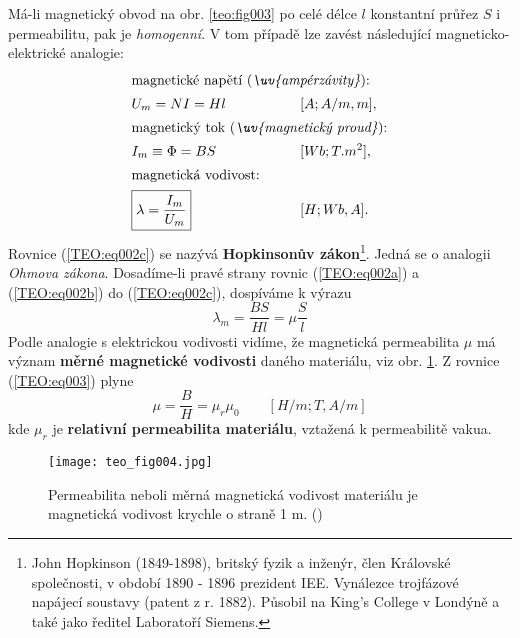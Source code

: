       Má-li magnetický obvod na obr. \ref{teo:fig003} po celé délce \(l\) konstantní průřez \(S\) i 
      permeabilitu, pak je \emph{homogenní}. V tom případě lze zavést následující 
      magneticko-elektrické analogie:
      \begin{alignat}{3}
       \shortintertext{magnetické napětí (\emph{\uv{ampérzávity}}):}
        & U_m = NI = Hl        \quad && \text{ } \qquad
           && [A; A/m, m],  \label{TEO:eq002a}  \\
        \shortintertext{magnetický tok (\emph{\uv{magnetický proud}}):} 
        & I_m\equiv\Phi = BS \quad && \text{ } \qquad 
           && [Wb; T. m^2], \label{TEO:eq002b}  \\
        \shortintertext{magnetická vodivost:}
        & \boxed{\lambda = \frac{I_m}{U_m}} \quad && \text{ } \qquad 
           && [H; Wb, A].   \label{TEO:eq002c} 
      \end{alignat}
      Rovnice (\ref{TEO:eq002c}) se nazývá \textbf{Hopkinsonův  zákon}\footnote{John Hopkinson 
      (\num{1849}-\num{1898}), britský fyzik a inženýr, člen Královské společnosti, v období 1890 - 
      1896 prezident IEE. Vynálezce trojfázové napájecí soustavy (patent z r. 1882). Působil na 
      King's College v Londýně a také jako ředitel Laboratoří Siemens.}. Jedná se o analogii 
      \emph{Ohmova zákona}. Dosadíme-li pravé strany rovnic (\ref{TEO:eq002a}) a (\ref{TEO:eq002b}) 
      do (\ref{TEO:eq002c}), dospíváme k výrazu
      \begin{equation}  \label{TEO:eq003}
        \lambda_m = \frac{BS}{Hl} = \mu\frac{S}{l}
      \end{equation}
      Podle analogie s elektrickou vodivosti vidíme, že magnetická permeabilita \(\mu\) má význam 
      \textbf{měrné magnetické vodivosti} daného materiálu, viz obr. \ref{teo:fig004}. Z rovnice 
      (\ref{TEO:eq003}) plyne
      \begin{equation}  \label{TEO:eq004}
        \boxed{\mu = \frac{B}{H} = \mu_r\mu_0} \qquad [H/m; T, A/m]
      \end{equation}
      kde \(\mu_r\) je \textbf{relativní permeabilita materiálu}, vztažená k permeabilitě vakua.
      \begin{figure}[ht!] %
        \centering
        \texttt{[image: teo\_fig004.jpg]}
        \caption{Permeabilita neboli měrná magnetická vodivost materiálu je magnetická vodivost 
                 krychle o straně 1 m.
                 (\cite[s.~152]{Patocka4})}
        \label{teo:fig004}
      \end{figure}

